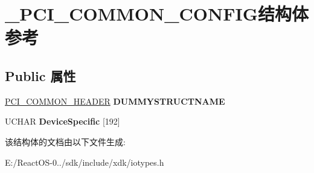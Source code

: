 \hypertarget{struct___p_c_i___c_o_m_m_o_n___c_o_n_f_i_g}{}\section{\+\_\+\+P\+C\+I\+\_\+\+C\+O\+M\+M\+O\+N\+\_\+\+C\+O\+N\+F\+I\+G结构体 参考}
\label{struct___p_c_i___c_o_m_m_o_n___c_o_n_f_i_g}
\subsection*{Public 属性}
\begin{DoxyCompactItemize}
\item 
\mbox{\label{struct___p_c_i___c_o_m_m_o_n___c_o_n_f_i_g_a63099c861ed0673a3c3b3a81cf5e2799}} 
\hyperlink{struct___p_c_i___c_o_m_m_o_n___h_e_a_d_e_r}{P\+C\+I\+\_\+\+C\+O\+M\+M\+O\+N\+\_\+\+H\+E\+A\+D\+ER} {\bfseries D\+U\+M\+M\+Y\+S\+T\+R\+U\+C\+T\+N\+A\+ME}
\item 
\mbox{\label{struct___p_c_i___c_o_m_m_o_n___c_o_n_f_i_g_a404ba4066a166aa575626c82e38472b7}} 
U\+C\+H\+AR {\bfseries Device\+Specific} \mbox{[}192\mbox{]}
\end{DoxyCompactItemize}


该结构体的文档由以下文件生成\+:\begin{DoxyCompactItemize}
\item 
E\+:/\+React\+O\+S-\/0../sdk/include/xdk/iotypes.\+h\end{DoxyCompactItemize}
